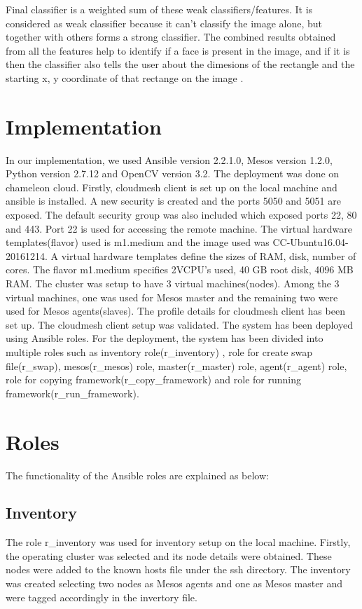 \documentclass[9pt,twocolumn,twoside]{../../styles/osajnl}
\begin{document}
Final classifier is a weighted sum of these weak
classifiers/features. It is considered as weak classifier because it
can't classify the image alone, but together with others forms a
strong classifier. The combined results obtained from all the features
help to identify if a face is present in the image, and if it is then
the classifier also tells the user about the dimesions of the
rectangle and the starting x, y coordinate of that rectange on the
image \cite{www-adaboost-wiki}.

\section{Implementation}
In our implementation, we used Ansible version 2.2.1.0, Mesos version
1.2.0, Python version 2.7.12 and OpenCV version 3.2. The deployment
was done on chameleon cloud.  Firstly, cloudmesh client is set up on
the local machine and ansible is installed. A new security is created
and the ports 5050 and 5051 are exposed. The default security group
was also included which exposed ports 22, 80 and 443. Port 22 is used
for accessing the remote machine. The virtual hardware
templates(flavor) used is m1.medium and the image used was
CC-Ubuntu16.04-20161214. A virtual hardware templates define the sizes
of RAM, disk, number of cores. The flavor m1.medium specifies 2VCPU's
used, 40 GB root disk, 4096 MB RAM. The cluster was setup to have 3
virtual machines(nodes). Among the 3 virtual machines, one was used
for Mesos master and the remaining two were used for Mesos
agents(slaves).  The profile details for cloudmesh client has been set
up. The cloudmesh client setup was validated. The system has been
deployed using Ansible roles. For the deployment, the system has been
divided into multiple roles such as inventory role(r\_inventory) ,
role for create swap file(r\_swap), mesos(r\_mesos) role,
master(r\_master) role, agent(r\_agent) role, role for copying
framework(r\_copy\_framework) and role for running
framework(r\_run\_framework).

\section{Roles}
The functionality of the Ansible roles are explained as below:

\subsection{Inventory}
The role r\_inventory was used for inventory setup on the local
machine.  Firstly, the operating cluster was selected and its node
details were obtained. These nodes were added to the known hosts file
under the ssh directory. The inventory was created selecting two nodes
as Mesos agents and one as Mesos master and were tagged accordingly in
the invertory file.
\end{document}
